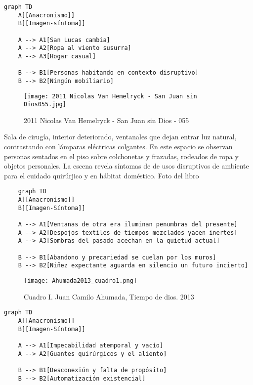 \small
\singlespacing \begin{verbatim}
graph TD
    A[[Anacronismo]]
    B[[Imagen-síntoma]]

    A --> A1[San Lucas cambia]
    A --> A2[Ropa al viento susurra]
    A --> A3[Hogar casual]

    B --> B1[Personas habitando en contexto disruptivo]
    B --> B2[Ningún mobiliario]
\end{verbatim}
\normalsize

\clearpage
\begin{figure}[h!]
    \centering
    \texttt{[image: 2011 Nicolas Van Hemelryck - San Juan sin Dios055.jpg]}
    \caption{2011 Nicolas Van Hemelryck - San Juan sin Dios - 055}
    \label{fig:2011NicolasVanHemelryckSanJuansinDios-055}
\end{figure}

Sala de cirugía, interior deteriorado, ventanales que dejan entrar luz natural, contrastando con lámparas eléctricas colgantes. En este espacio se observan personas sentados en el piso sobre colchonetas y frazadas, rodeados de ropa y objetos personales. La escena revela síntomas de de usos disruptivos de ambiente para el cuidado quirúrjico y en hábitat doméstico. Foto del libro \parencite{Hemelryck2011}

\small
\singlespacing \begin{verbatim}
    graph TD
    A[[Anacronismo]]
    B[[Imagen-Síntoma]]

    A --> A1[Ventanas de otra era iluminan penumbras del presente]
    A --> A2[Despojos textiles de tiempos mezclados yacen inertes]
    A --> A3[Sombras del pasado acechan en la quietud actual]

    B --> B1[Abandono y precariedad se cuelan por los muros]
    B --> B2[Niñez expectante aguarda en silencio un futuro incierto]

\end{verbatim}
\normalsize


\clearpage
\begin{figure}[h!]
    \centering
    \texttt{[image: Ahumada2013\_cuadro1.png]}
    \caption{Cuadro I. Juan Camilo Ahumada, Tiempo de dios. 2013}
    \label{fig:Ahumada2013_cuadro1}
\end{figure}

\parencite[p. 10]{Ahumada2013}

\small
\singlespacing \begin{verbatim}
graph TD
    A[[Anacronismo]]
    B[[Imagen-Síntoma]]
    
    A --> A1[Impecabilidad atemporal y vacío]
    A --> A2[Guantes quirúrgicos y el aliento]

    B --> B1[Desconexión y falta de propósito]
    B --> B2[Automatización existencial]

\end{verbatim}
\normalsize

